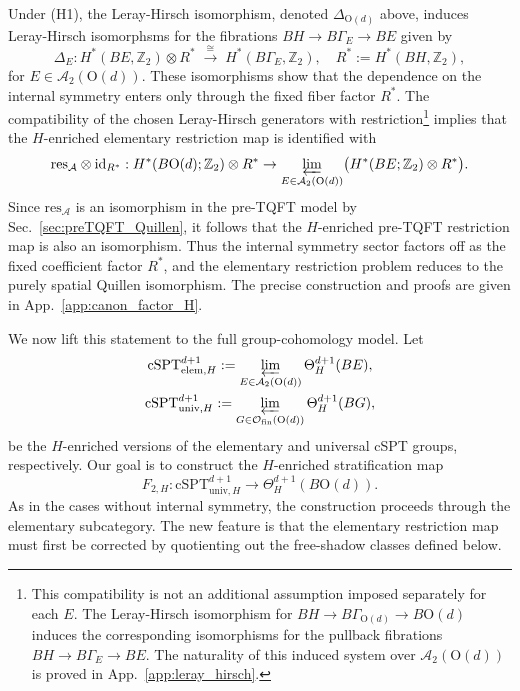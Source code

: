 \documentclass[aps,prx,reprint,superscriptaddress,twocolumn,amsmath,amssymb,amsfonts, nofootinbib]{revtex4-2}
\newcommand{\ofin}{\mathcal{O}_{\text{fin}}}
\newcommand{\qa}{\mathcal{A}_{2}}
\newcommand{\res}{\text{res}}
\theoremstyle{apsstyle}
\begin{document}
{\noindent Under (H1), the Leray-Hirsch isomorphism, denoted $\Delta_{\mathrm{O}(d)}$ above, induces Leray-Hirsch isomorphsms for the fibrations $BH \longrightarrow B\Gamma_E \longrightarrow BE$ given by
\begin{equation*}
\Delta_{E}: H^{*}(BE,\mathbb Z_{2})\otimes R^{*}
\;\xrightarrow{\;\cong\;}\; H^{*}(B\Gamma_{E},\mathbb Z_{2}),
\quad R^{*}:=H^{*}(BH,\mathbb Z_{2}),
\end{equation*}
for $E\in\qa(\mathrm{O}(d))$. These isomorphisms show that the dependence on the internal symmetry enters only through the fixed fiber factor $R^{*}$. The compatibility of the chosen Leray-Hirsch generators with restriction\footnote{This compatibility is not an additional assumption imposed separately for each $E$. The Leray-Hirsch isomorphism for $BH\to B\Gamma_{\mathrm{O}(d)}\to B\mathrm{O}(d)$ induces the corresponding isomorphisms for the pullback fibrations $BH\to B\Gamma_E\to BE$. The naturality of this induced system over $\mathcal A_2(\mathrm{O}(d))$ is proved in App.~\ref{app:leray_hirsch}.} implies that the $H$-enriched elementary restriction map is identified with 
\begin{equation*}
\res_{\mathcal A}\otimes \mathrm{id}_{R^{*}}: H^{*}(B\mathrm{O}(d);\mathbb Z_2)\otimes R^{*} \rightarrow \varprojlim_{E\in\qa(\mathrm{O}(d))} \bigl(H^{*}(BE;\mathbb Z_2)\otimes R^{*}\bigr).
\end{equation*}
Since $\res_{\mathcal A}$ is an isomorphism in the pre-TQFT model by Sec.~\ref{sec:preTQFT_Quillen}, it follows that the $H$-enriched pre-TQFT restriction map is also an isomorphism. Thus the internal symmetry sector factors off as the fixed coefficient factor $R^{*}$, and the elementary restriction problem reduces to the purely spatial Quillen isomorphism. The precise construction and proofs are given in App.~\ref{app:canon_factor_H}.

\medskip

We now lift this statement to the full group-cohomology model. Let 
\begin{gather*} 
\mathrm{cSPT}^{d+1}_{\mathrm{elem},H} := \varprojlim_{E\in\mathcal A_2(\mathrm{O}(d))} \Theta^{d+1}_{H}(BE), \\
\mathrm{cSPT}^{d+1}_{\mathrm{univ},H} := \varprojlim_{G\in \ofin(\mathrm{O}(d))} \Theta^{d+1}_{H}(BG), 
\end{gather*} 
be the $H$-enriched versions of the elementary and universal cSPT groups, respectively. Our goal is to construct the $H$-enriched stratification map
\begin{equation*}
F_{2,H}: \mathrm{cSPT}^{d+1}_{\mathrm{univ},H} \longrightarrow \Theta^{d+1}_{H}(B\mathrm{O}(d)).
\end{equation*}
As in the cases without internal symmetry, the construction proceeds through the elementary subcategory. The new feature is that the elementary restriction map must first be corrected by quotienting out the free-shadow classes defined below.

}
\end{document}
